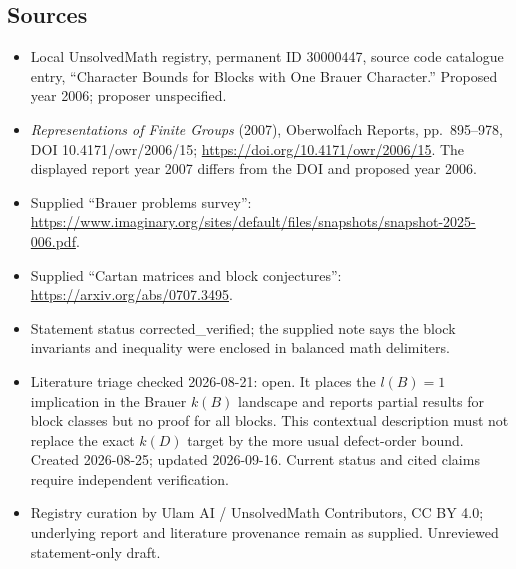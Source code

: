 \documentclass[11pt]{article}
\begin{document}
\subsection{Sources}
\begin{itemize}
\item Local UnsolvedMath registry, permanent ID 30000447, source code catalogue entry, ``Character Bounds for Blocks with One Brauer Character.'' Proposed year 2006; proposer unspecified.
\item \emph{Representations of Finite Groups} (2007), Oberwolfach Reports, pp.\ 895--978, DOI 10.4171/owr/2006/15; \url{https://doi.org/10.4171/owr/2006/15}. The displayed report year 2007 differs from the DOI and proposed year 2006.
\item Supplied ``Brauer problems survey'': \url{https://www.imaginary.org/sites/default/files/snapshots/snapshot-2025-006.pdf}.
\item Supplied ``Cartan matrices and block conjectures'': \url{https://arxiv.org/abs/0707.3495}.
\item Statement status corrected\_verified; the supplied note says the block invariants and inequality were enclosed in balanced math delimiters.
\item Literature triage checked 2026-08-21: open. It places the $l(B)=1$ implication in the Brauer $k(B)$ landscape and reports partial results for block classes but no proof for all blocks. This contextual description must not replace the exact $k(D)$ target by the more usual defect-order bound. Created 2026-08-25; updated 2026-09-16. Current status and cited claims require independent verification.
\item Registry curation by Ulam AI / UnsolvedMath Contributors, CC BY 4.0; underlying report and literature provenance remain as supplied. Unreviewed statement-only draft.
\end{itemize}
\end{document}
